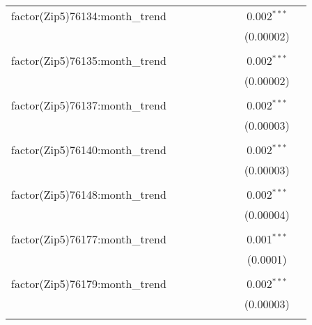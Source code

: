 \begin{table}[H]
{\begin{tabular}{@{\extracolsep{5pt}}lcccccccc}
  factor(Zip5)76134:month\_trend &  &  &  &  &  &  & 0.002$^{***}$ &  \\  

   &  &  &  &  &  &  & (0.00002) &  \\  

   & & & & & & & & \\  

  factor(Zip5)76135:month\_trend &  &  &  &  &  &  & 0.002$^{***}$ &  \\  

   &  &  &  &  &  &  & (0.00002) &  \\  

   & & & & & & & & \\  

  factor(Zip5)76137:month\_trend &  &  &  &  &  &  & 0.002$^{***}$ &  \\  

   &  &  &  &  &  &  & (0.00003) &  \\  

   & & & & & & & & \\  

  factor(Zip5)76140:month\_trend &  &  &  &  &  &  & 0.002$^{***}$ &  \\  

   &  &  &  &  &  &  & (0.00003) &  \\  

   & & & & & & & & \\  

  factor(Zip5)76148:month\_trend &  &  &  &  &  &  & 0.002$^{***}$ &  \\  

   &  &  &  &  &  &  & (0.00004) &  \\  

   & & & & & & & & \\  

  factor(Zip5)76177:month\_trend &  &  &  &  &  &  & 0.001$^{***}$ &  \\  

   &  &  &  &  &  &  & (0.0001) &  \\  

   & & & & & & & & \\  

  factor(Zip5)76179:month\_trend &  &  &  &  &  &  & 0.002$^{***}$ &  \\  

   &  &  &  &  &  &  & (0.00003) &  \\  

   & & & & & & & & \\  


\end{tabular}}
\end{table}
